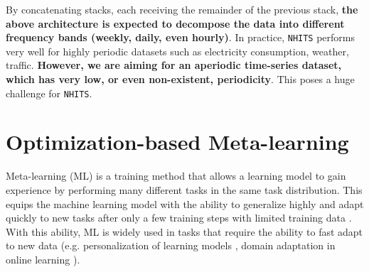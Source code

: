 By concatenating stacks, each receiving the remainder of the previous stack, \textbf{the above architecture is expected to decompose the data into different frequency bands (weekly, daily, even hourly)}. In practice, \verb|NHITS| performs very well for highly periodic datasets such as electricity consumption, weather, traffic. \textbf{However, we are aiming for an aperiodic time-series dataset, which has very low, or even non-existent, periodicity}. This poses a huge challenge for \verb|NHITS|.

\section{Optimization-based Meta-learning}
\label{sec:ml}


Meta-learning (ML) is a training method that allows a learning model to gain experience by performing many different tasks in the same task distribution. This equips the machine learning model with the ability to generalize highly and adapt quickly to new tasks after only a few training steps with limited training data \cite{hospedales2021meta, vettoruzzo2024advances}. With this ability, ML is widely used in tasks that require the ability to fast adapt to new data (e.g. personalization of learning models \cite{chen2018federated, fallah2020personalized,nguyen2022meta}, domain adaptation in online learning \cite{hu2023meta, khoe2024domain}).


